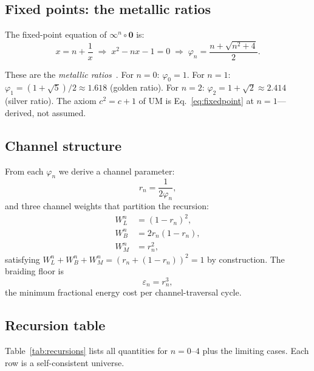 \documentclass[prd,twocolumn,preprintnumbers,amsmath,amssymb]{revtex4-2}
\newcommand{\acc}{\mathbf{\infty}}
\newcommand{\inv}{\mathbf{0}}
\newcommand{\phin}{\varphi_n}
\begin{document}
\subsection{Fixed points: the metallic ratios}

The fixed-point equation of $\acc^n \circ \inv$ is:
\begin{equation}
  x = n + \frac{1}{x}
  \;\Longrightarrow\;
  x^2 - nx - 1 = 0
  \;\Longrightarrow\;
  \phin = \frac{n + \sqrt{n^2+4}}{2}.
  \label{eq:fixedpoint}
\end{equation}

These are the \emph{metallic ratios}~\cite{Spinadel1999}.  For $n=0$:
$\varphi_0 = 1$.  For $n=1$: $\varphi_1 = (1+\sqrt{5})/2 \approx 1.618$
(golden ratio).  For $n=2$: $\varphi_2 = 1+\sqrt{2} \approx 2.414$
(silver ratio).  The axiom $c^2 = c+1$ of UM is
Eq.~\eqref{eq:fixedpoint} at $n=1$---derived, not assumed.

\subsection{Channel structure}

From each $\phin$ we derive a channel parameter:
\begin{equation}
  r_n = \frac{1}{2\phin},
  \label{eq:rn}
\end{equation}
and three channel weights that partition the recursion:
\begin{align}
  W_L^n &= (1-r_n)^2, \label{eq:WL}\\
  W_B^n &= 2r_n(1-r_n), \label{eq:WB}\\
  W_M^n &= r_n^2, \label{eq:WM}
\end{align}
satisfying $W_L^n + W_B^n + W_M^n = (r_n + (1-r_n))^2 = 1$ by
construction.  The braiding floor is
\begin{equation}
  \varepsilon_n = r_n^3,
  \label{eq:eps}
\end{equation}
the minimum fractional energy cost per channel-traversal cycle.

\subsection{Recursion table}

Table~\ref{tab:recursions} lists all quantities for $n=0$--$4$ plus
the limiting cases. Each row is a self-consistent universe.
\end{document}

